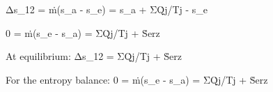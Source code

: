 Δs_12 = ṁ(s_a - s_e) = s_a + ΣQ̇j/Tj - s_e  

0 = ṁ(s_e - s_a) = ΣQ̇j/Tj + Ṡerz  

At equilibrium:  
Δs_12 = ΣQ̇j/Tj + Ṡerz  

For the entropy balance:  
0 = ṁ(s_e - s_a) = ΣQ̇j/Tj + Ṡerz